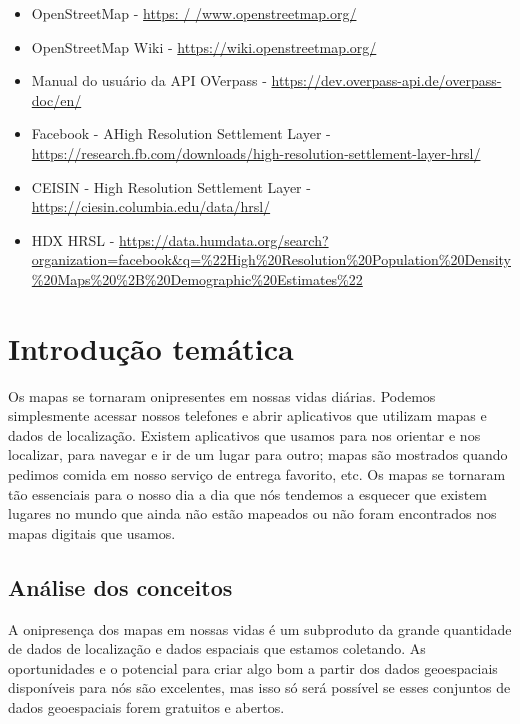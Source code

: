 \documentclass[
  portuguese,
]{krantz}
\providecommand{\tightlist}{%
  \setlength{\itemsep}{0pt}\setlength{\parskip}{0pt}}
\begin{document}
\begin{itemize}
\tightlist
\item
  OpenStreetMap - \href{https://www.openstreetmap.org/}{https: / /www.openstreetmap.org/}
\item
  OpenStreetMap Wiki - \url{https://wiki.openstreetmap.org/}
\item
  Manual do usuário da API OVerpass - \url{https://dev.overpass-api.de/overpass-doc/en/}
\item
  Facebook - AHigh Resolution Settlement Layer - \url{https://research.fb.com/downloads/high-resolution-settlement-layer-hrsl/}
\item
  CEISIN - High Resolution Settlement Layer - \url{https://ciesin.columbia.edu/data/hrsl/}
\item
  HDX HRSL - \href{https://dados.humdata.org/search?organization=facebook\&q=\%22High\%20Resolution\%20Population\%20Density\%20Maps\%20\%2B\%20Demographic\%20Estimates\%22}{https://data.humdata.org/search?organization=facebook\&q=\%22High\%20Resolution\%20Population\%20Density\%20Maps\%20\%2B\%20Demographic\%20Estimates\%22}
\end{itemize}

\hypertarget{introduuxe7uxe3o-temuxe1tica-2}{%
\section{Introdução temática}\label{introduuxe7uxe3o-temuxe1tica-2}}

Os mapas se tornaram onipresentes em nossas vidas diárias. Podemos simplesmente acessar nossos telefones e abrir aplicativos que utilizam mapas e dados de localização. Existem aplicativos que usamos para nos orientar e nos localizar, para navegar e ir de um lugar para outro; mapas são mostrados quando pedimos comida em nosso serviço de entrega favorito, etc. Os mapas se tornaram tão essenciais para o nosso dia a dia que nós tendemos a esquecer que existem lugares no mundo que ainda não estão mapeados ou não foram encontrados nos mapas digitais que usamos.

\hypertarget{anuxe1lise-dos-conceitos}{%
\subsection{Análise dos conceitos}\label{anuxe1lise-dos-conceitos}}

A onipresença dos mapas em nossas vidas é um subproduto da grande quantidade de dados de localização e dados espaciais que estamos coletando. As oportunidades e o potencial para criar algo bom a partir dos dados geoespaciais disponíveis para nós são excelentes, mas isso só será possível se esses conjuntos de dados geoespaciais forem gratuitos e abertos.
\end{document}
